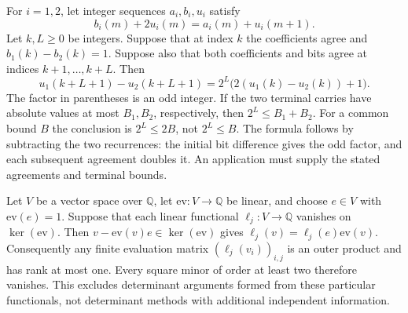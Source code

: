 \begin{lem}
\label{lem:reverse-carry-word}
For $i=1,2$, let integer sequences $a_i,b_i,u_i$ satisfy
\[
 b_i(m)+2u_i(m)=a_i(m)+u_i(m+1).
\]
Let $k,L\ge0$ be integers.  Suppose that at index $k$ the coefficients agree and
$b_1(k)-b_2(k)=1$.  Suppose also that both coefficients and bits
agree at indices $k+1,\ldots,k+L$.  Then
\[
 u_1(k+L+1)-u_2(k+L+1)
   =2^L\bigl(2(u_1(k)-u_2(k))+1\bigr).
\]
The factor in parentheses is an odd integer.  If the two terminal
carries have absolute values at most $B_1,B_2$, respectively, then
$2^L\le B_1+B_2$.  For a common bound $B$ the conclusion is
$2^L\le2B$, not $2^L\le B$.
The formula follows by subtracting the two recurrences: the
initial bit difference gives the odd factor, and each subsequent
agreement doubles it.  An application must supply the stated
agreements and terminal bounds.
\end{lem}

\begin{lem}
\label{lem:linear-channel-nogo}
Let $V$ be a vector space over $\mathbb Q$, let
$\mathrm{ev}:V\to\mathbb Q$ be linear, and choose $e\in V$ with
$\mathrm{ev}(e)=1$.  Suppose that each linear functional
$\ell_j:V\to\mathbb Q$ vanishes on $\ker(\mathrm{ev})$.
Then $v-\mathrm{ev}(v)e\in\ker(\mathrm{ev})$ gives
$\ell_j(v)=\ell_j(e)\mathrm{ev}(v)$.
Consequently any finite evaluation matrix $(\ell_j(v_i))_{i,j}$ is an
outer product and has rank at most one.  Every square minor of order
at least two therefore vanishes.  This excludes determinant arguments
formed from these particular functionals, not determinant methods
with additional independent information.
\end{lem}

